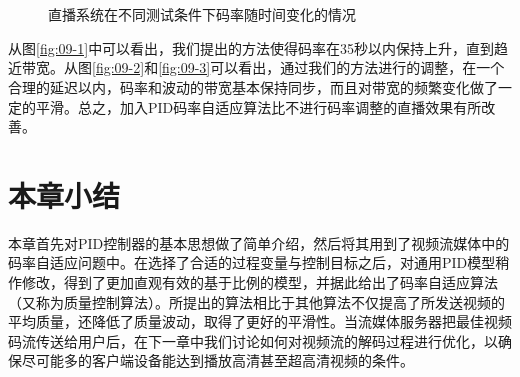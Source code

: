 \begin{figure}
	\centering
	 \\
	 \\
	\caption{直播系统在不同测试条件下码率随时间变化的情况}
	\label{fig:09}
\end{figure}

从图\ref{fig:09-1}中可以看出，我们提出的方法使得码率在35秒以内保持上升，直到趋近带宽。从图\ref{fig:09-2}和\ref{fig:09-3}可以看出，通过我们的方法进行的调整，在一个合理的延迟以内，码率和波动的带宽基本保持同步，而且对带宽的频繁变化做了一定的平滑。总之，加入PID码率自适应算法比不进行码率调整的直播效果有所改善。


\section{本章小结}

本章首先对PID控制器的基本思想做了简单介绍，然后将其用到了视频流媒体中的码率自适应问题中。在选择了合适的过程变量与控制目标之后，对通用PID模型稍作修改，得到了更加直观有效的基于比例的模型，并据此给出了码率自适应算法（又称为质量控制算法）。所提出的算法相比于其他算法不仅提高了所发送视频的平均质量，还降低了质量波动，取得了更好的平滑性。当流媒体服务器把最佳视频码流传送给用户后，在下一章中我们讨论如何对视频流的解码过程进行优化，以确保尽可能多的客户端设备能达到播放高清甚至超高清视频的条件。